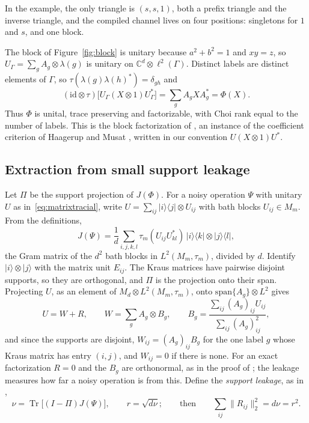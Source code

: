 \documentclass[11pt]{article}
\newcommand{\Tr}{\operatorname{Tr}}
\newcommand{\ket}[1]{\lvert #1\rangle}
\newcommand{\bra}[1]{\langle #1\rvert}
\begin{document}
In the example, the only triangle is $(s,s,1)$, both a prefix triangle and the inverse triangle, and the compiled channel lives on four positions: singletons for $1$ and $s$, and one block.

The block of Figure~\ref{fig:block} is unitary because $a^2+b^2=1$ and $xy=z$, so $U_\Gamma=\sum_gA_g\otimes\lambda(g)$ is unitary on $\mathbb C^d\otimes\ell^2(\Gamma)$.  Distinct labels are distinct elements of $\Gamma$, so $\tau(\lambda(g)\lambda(h)^*)=\delta_{gh}$ and
\[
 (\mathrm{id}\otimes\tau)\bigl[U_\Gamma(X\otimes1)U_\Gamma^*\bigr]=\sum_gA_gXA_g^*=\Phi(X).
\]
Thus $\Phi$ is unital, trace preserving and factorizable, with Choi rank equal to the number of labels.  This is the block factorization of \cite[Proposition~3]{MghirbiDouglasV1}, an instance of the coefficient criterion of Haagerup and Musat \cite[Theorem~2.2]{HaagerupMusat11}, written in our convention $U(X\otimes1)U^*$.

\subsection{Extraction from small support leakage}
Let $\Pi$ be the support projection of $J(\Phi)$.  For a noisy operation $\Psi$ with unitary $U$ as in~\eqref{eq:matrixtracial}, write $U=\sum_{ij}\ket i\!\bra j\otimes U_{ij}$ with bath blocks $U_{ij}\in M_m$.  From the definitions,
\[
 J(\Psi)=\frac1d\sum_{i,j,k,l}\tau_m(U_{ij}U_{kl}^*)\,\ket i\!\bra k\otimes\ket j\!\bra l,
\]
the Gram matrix of the $d^2$ bath blocks in $L^2(M_m,\tau_m)$, divided by $d$.  Identify $\ket i\otimes\ket j$ with the matrix unit $E_{ij}$.  The Kraus matrices have pairwise disjoint supports, so they are orthogonal, and $\Pi$ is the projection onto their span.  Projecting $U$, as an element of $M_d\otimes L^2(M_m,\tau_m)$, onto $\mathrm{span}\{A_g\}\otimes L^2$ gives
\begin{equation}\label{eq:split}
 U=W+R,\qquad W=\sum_gA_g\otimes B_g,\qquad B_g=\frac{\sum_{ij}(A_g)_{ij}U_{ij}}{\sum_{ij}(A_g)_{ij}^2},
\end{equation}
and since the supports are disjoint, $W_{ij}=(A_g)_{ij}B_g$ for the one label $g$ whose Kraus matrix has entry $(i,j)$, and $W_{ij}=0$ if there is none.  For an exact factorization $R=0$ and the $B_g$ are orthonormal, as in the proof of \cite[Theorem~2.2]{HaagerupMusat11}; the leakage measures how far a noisy operation is from this.  Define the \emph{support leakage}, as in \cite[Definition~2.2]{DouglasMghirbiCausal},
\[
 \nu=\Tr\bigl[(I-\Pi)J(\Psi)\bigr],\qquad r=\sqrt{d\nu};\qquad\text{then}\qquad \sum_{ij}\|R_{ij}\|_2^2=d\nu=r^2.
\]
\end{document}

